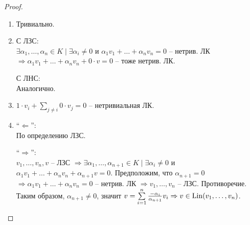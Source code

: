 \begin{proof} $ $

    \begin{enumerate} 
        \item Тривиально.
        \item С ЛЗС: \\
        $\exists \alpha_1, \dots, \alpha_n \in K \mid 
        \exists \alpha_i \neq 0$ и 
        $\alpha_1 v_1 + \dots + \alpha_n v_n = 0$ -- нетрив. ЛК 
        $\Longrightarrow \alpha_1 v_1 + \dots + \alpha_n v_n + 0 \cdot v 
        = 0$ -- тоже нетрив. ЛК.

        С ЛНС: \\
        Аналогично.

        \item $1 \cdot v_i + \sum \limits_{j \neq i} 0 \cdot v_j = 0$ --
        нетривиальная ЛК.

        \item 
        ``$\Longleftarrow$'':\\
        По определению ЛЗС.

        ``$\Longrightarrow$'':\\
        $v_1, \dots, v_n, v$ -- ЛЗС $\Rightarrow \exists
        \alpha_1, \dots, \alpha_{n+1} \in K \mid \exists \alpha_i \neq 0$
        и $\alpha_1 v_1 + \dots + \alpha_n v_n + \alpha_{n+1} v = 0$.
        Предположим, что $\alpha_{n+1} = 0$ $\Rightarrow 
        \alpha_1 v_1 + \dots + \alpha_n v_n = 0$ -- нетрив. ЛК
        $\Rightarrow v_1, \dots, v_n$ -- ЛЗС. Противоречие.
        Таким образом, $\alpha_{n+1} \neq 0$, значит
        $v = \sum \limits_{i = 1}^n \frac{-\alpha_i}{\alpha_{n + 1}}
        v_i \Rightarrow v \in \operatorname{Lin}(v_1, \dots, v_n)$.


    \end{enumerate}
\end{proof}
